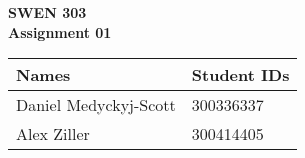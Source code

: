 \documentclass[a4paper,oneside,12pt]{article}
\begin{document}
\fontsize{80}{100}
\selectfont 
\noindent
{\bf SWEN 303\\
\fontsize{36}{50}
\selectfont 
Assignment 01\\
\begin{tabularx}{\textwidth}{X| X}
Names & Student IDs\\ \hline
Daniel Medyckyj-Scott & 300336337\\
Alex Ziller & 300414405
\end{tabularx}
}
\pagebreak

\fontsize{12}{14}
\selectfont


\end{document}

